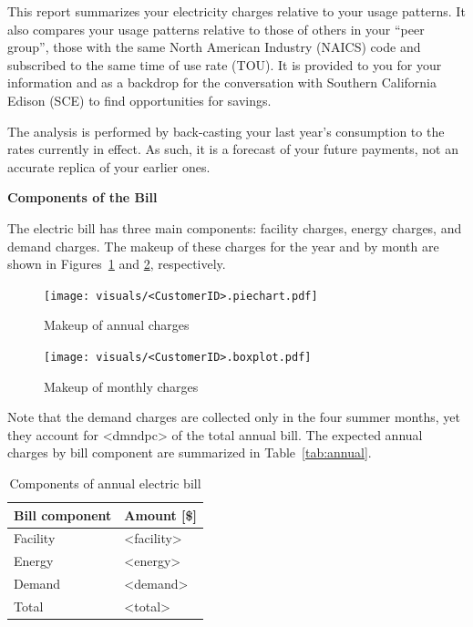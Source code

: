 \documentclass[11pt]{article}
\begin{document}
\pagestyle{title}
This report summarizes your electricity charges relative to your usage patterns. It also compares your usage patterns relative to those of others in your ``peer group'', those with the same North American Industry (NAICS) code and subscribed to the same time of use rate (TOU). It is provided to you for your information and as a backdrop for the conversation with Southern California Edison (SCE) to find opportunities for savings.

The analysis is performed by back-casting your last year's consumption to the rates currently in effect. As such, it is a forecast of your future payments, not an accurate replica of your earlier ones.

\vspace{3ex}
\textbf{\Large Components of the Bill}
\vspace{1ex}

The electric bill has three main components: facility charges, energy charges, and demand charges. The makeup of these charges for the year and by month are shown in Figures~\ref{fig:pie} and \ref{fig:bars}, respectively.
\begin{figure}[!h]
\centering
\texttt{[image: visuals/<CustomerID>.piechart.pdf]}
\caption{Makeup of annual charges}
\label{fig:pie}
\end{figure}

\begin{figure}[!h]
\centering
\texttt{[image: visuals/<CustomerID>.boxplot.pdf]}
\caption{Makeup of monthly charges}
\label{fig:bars}
\end{figure}

Note that the demand charges are collected only in the four summer months, yet they account for <dmndpc> of the total annual bill. The expected annual charges by bill component are summarized in Table~\ref{tab:annual}.

\begin{table}[th!]
  \centering
  \caption{Components of annual electric bill}
  \vspace{1.5ex}
  \label{tab:energy}
  \begin{tabular}{ll}
    Bill component & Amount [\$] \\
    \midrule
    Facility & <facility> \\
    Energy & <energy> \\
    Demand & <demand> \\
    \midrule
    Total & <total>
  \end{tabular}
\end{table}
\clearpage
\end{document}
